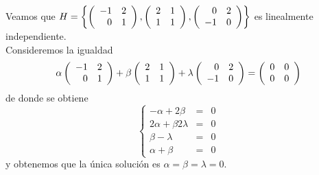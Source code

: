 \begin{ejemplo}

Veamos que $H = \left\{ \matrdxd{-1 & 2}{0 & 1}, \matrdxd{2 & 1}{1 & 1} , \matrdxd{0 & 2}{-1 & 0} \right \}$ es linealmente independiente.\\
Consideremos la igualdad
$$\alpha \matrdxd {-1 & 2}{0&1} + \beta \matrdxd {2&1}{1&1} + \lambda \matrdxd {0 & 2}{-1 & 0} = \matrdxd {0&0}{0&0}$$
de donde se obtiene
$$\left\{
\begin{array}{rcl}
-\alpha + 2\beta &=&0\\
2\alpha +\beta 2\lambda &=&0\\
\beta - \lambda &=& 0\\
\alpha + \beta &=&0

\end{array}
\right.$$
y obtenemos que la única solución es $\alpha = \beta = \lambda = 0$.\\
\end{ejemplo}
